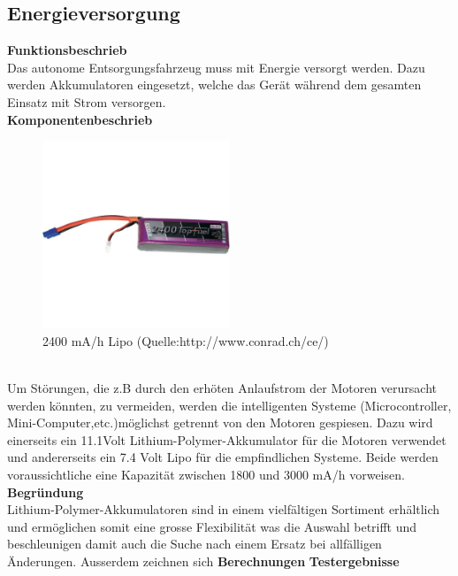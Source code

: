 \subsection{Energieversorgung}

\textbf{Funktionsbeschrieb}\\[0.2cm]
Das autonome Entsorgungsfahrzeug muss mit Energie versorgt werden. Dazu werden Akkumulatoren eingesetzt, welche das Gerät während dem gesamten Einsatz mit Strom versorgen. 
\\[0.2cm]
\textbf{Komponentenbeschrieb}\\[0.2cm]
\begin{figure}[h]
\centering
\includegraphics[width=0.5\textwidth]{03_Loesungskonzept/pictures/lipo.JPG}
\caption{2400 mA/h Lipo  (Quelle:http://www.conrad.ch/ce/)}	
\end{figure}\\[0.2cm]
Um Störungen, die z.B durch den erhöten Anlaufstrom der Motoren verursacht werden könnten, zu vermeiden, werden die intelligenten Systeme (Microcontroller, Mini-Computer,etc.)möglichst getrennt von den Motoren gespiesen. Dazu wird einerseits ein 11.1Volt Lithium-Polymer-Akkumulator für die Motoren verwendet und andererseits ein 7.4 Volt Lipo für die empfindlichen Systeme. Beide werden voraussichtliche eine Kapazität zwischen 1800 und 3000 mA/h vorweisen.
 \\[0.2cm]
\textbf{Begründung}\\
Lithium-Polymer-Akkumulatoren sind in einem vielfältigen Sortiment erhältlich und ermöglichen somit eine grosse Flexibilität was die Auswahl betrifft und beschleunigen damit auch die Suche nach einem Ersatz bei allfälligen Änderungen. Ausserdem zeichnen sich 
\textbf{Berechnungen}
\textbf{Testergebnisse}